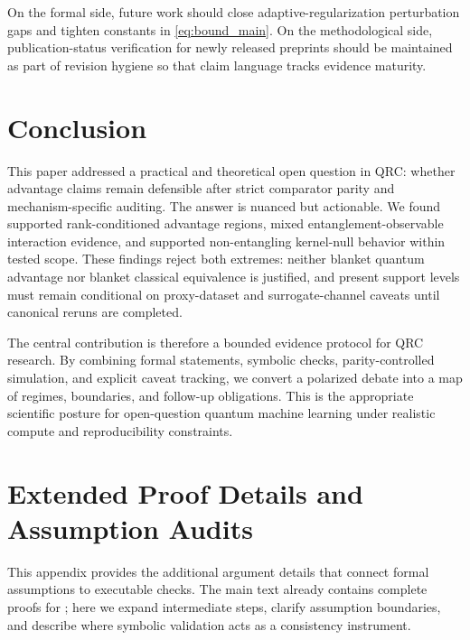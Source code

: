 \documentclass{article} %
\begin{document}
On the formal side, future work should close adaptive-regularization perturbation gaps and tighten constants in \eqref{eq:bound_main}. On the methodological side, publication-status verification for newly released preprints should be maintained as part of revision hygiene so that claim language tracks evidence maturity.

\section{Conclusion}\label{sec:conclusion}
This paper addressed a practical and theoretical open question in QRC: whether advantage claims remain defensible after strict comparator parity and mechanism-specific auditing. The answer is nuanced but actionable. We found supported rank-conditioned advantage regions, mixed entanglement-observable interaction evidence, and supported non-entangling kernel-null behavior within tested scope. These findings reject both extremes: neither blanket quantum advantage nor blanket classical equivalence is justified, and present support levels must remain conditional on proxy-dataset and surrogate-channel caveats until canonical reruns are completed.

The central contribution is therefore a bounded evidence protocol for QRC research. By combining formal statements, symbolic checks, parity-controlled simulation, and explicit caveat tracking, we convert a polarized debate into a map of regimes, boundaries, and follow-up obligations. This is the appropriate scientific posture for open-question quantum machine learning under realistic compute and reproducibility constraints.

\clearpage{}\label{sec:end_of_main}






\appendix
\clearpage{}\label{sec:appendix_start}

\section{Extended Proof Details and Assumption Audits}\label{app:proofs}
This appendix provides the additional argument details that connect formal assumptions to executable checks. The main text already contains complete proofs for ; here we expand intermediate steps, clarify assumption boundaries, and describe where symbolic validation acts as a consistency instrument.
\end{document}
